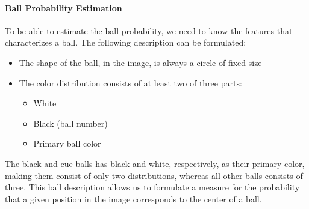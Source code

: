 \paragraph{Ball Probability Estimation}
To be able to estimate the ball probability, we need to know the features that characterizes a ball. The following description can be formulated:
\begin{itemize}
\item The shape of the ball, in the image, is always a circle of fixed size
\item The color distribution consists of at least two of three parts:
	\begin{itemize}
		\item White
		\item Black (ball number)
		\item Primary ball color
	\end{itemize}
\end{itemize}
The black and cue balls has black and white, respectively, as their primary color, making them consist of only two distributions, whereas all other balls consists of three. This ball description allows us to formulate a measure for the probability that a given position in the image corresponds to the center of a ball.

